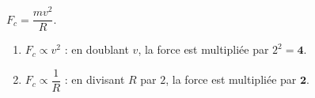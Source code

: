 \documentclass[11pt,a4paper]{article}
\begin{document}
\begin{corrige}
$F_c=\dfrac{mv^2}{R}$.
\begin{enumerate}[label=\alph*)]
  \item $F_c\propto v^2$ : en doublant $v$, la force est multipliée par $2^2=\mathbf{4}$.
  \item $F_c\propto \dfrac{1}{R}$ : en divisant $R$ par $2$, la force est multipliée par $\mathbf{2}$.
\end{enumerate}
\end{corrige}
\end{document}
